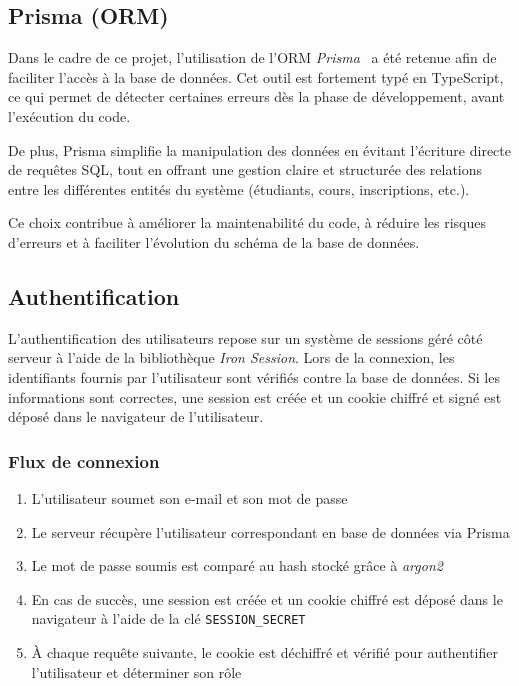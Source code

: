 \documentclass{article}
\begin{document}
\subsection{Prisma (ORM)}

Dans le cadre de ce projet, l’utilisation de l’ORM \textit{Prisma}~\cite{prisma} a été retenue afin de faciliter l’accès à la base de données. Cet outil est fortement typé en TypeScript, ce qui permet de détecter certaines erreurs dès la phase de développement, avant l’exécution du code.

De plus, Prisma simplifie la manipulation des données en évitant l’écriture directe de requêtes SQL, tout en offrant une gestion claire et structurée des relations entre les différentes entités du système (étudiants, cours, inscriptions, etc.).

Ce choix contribue à améliorer la maintenabilité du code, à réduire les risques d’erreurs et à faciliter l’évolution du schéma de la base de données.

\subsection{Authentification}
L'authentification des utilisateurs repose sur un système de sessions 
géré côté serveur à l'aide de la bibliothèque \textit{Iron Session}. 
Lors de la connexion, les identifiants fournis par l'utilisateur sont 
vérifiés contre la base de données. Si les informations sont correctes, 
une session est créée et un cookie chiffré et signé est déposé dans 
le navigateur de l'utilisateur.

\subsubsection{Flux de connexion}
\begin{enumerate}
    \item L'utilisateur soumet son e-mail et son mot de passe
    \item Le serveur récupère l'utilisateur correspondant en base 
    de données via Prisma
    \item Le mot de passe soumis est comparé au hash stocké 
    grâce à \textit{argon2}~\cite{argon2}
    \item En cas de succès, une session est créée et un cookie 
    chiffré est déposé dans le navigateur à l'aide de la clé 
    \texttt{SESSION\_SECRET}
    \item À chaque requête suivante, le cookie est déchiffré 
    et vérifié pour authentifier l'utilisateur et déterminer 
    son rôle
\end{enumerate}
\end{document}
